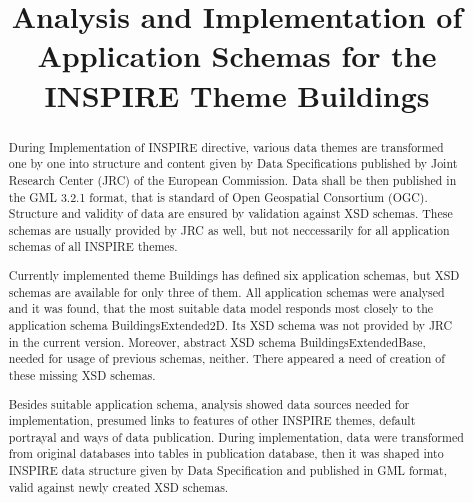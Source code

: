 \documentclass[eprint]{actapoly}
\begin{document}
\title[Implementation of the INSPIRE Theme Buildings]
{Analysis and Implementation of Application Schemas for the INSPIRE Theme Buildings}



\begin{abstract}
During Implementation of INSPIRE directive, various data themes are transformed one by one into structure and content given by Data Specifications published by Joint Research Center (JRC) of the European Commission. Data shall be then published in the GML 3.2.1 format, that is standard of Open Geospatial Consortium (OGC). Structure and validity of data are ensured by validation against XSD schemas. These schemas are usually provided by JRC as well, but not neccessarily for all application schemas of all INSPIRE themes. 

Currently implemented theme Buildings has defined six application schemas, but XSD schemas are available for only three of them. All application schemas were analysed and it was found, that the most suitable data model responds most closely to the application schema BuildingsExtended2D. Its XSD schema was not provided by JRC in the current version. Moreover, abstract XSD schema BuildingsExtendedBase, needed for usage of previous schemas, neither. There appeared a need of creation of these missing XSD schemas.

Besides suitable application schema, analysis showed data sources needed for implementation, presumed links to features of other INSPIRE themes, default portrayal and ways of data publication. During implementation, data were transformed from original databases into tables in publication database, then it was shaped into INSPIRE data structure given by Data Specification and published in GML format, valid against newly created XSD schemas.
\end{abstract}


\maketitle
\end{document}

